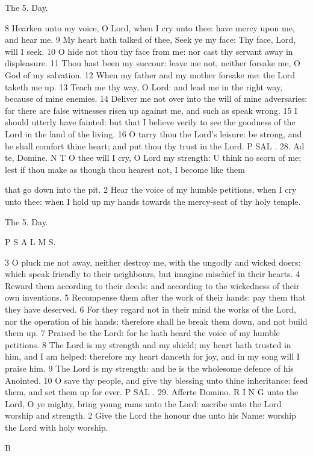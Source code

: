 The 5. Day.

8 Hearken unto my voice, O Lord, when I cry unto thee: have mercy upon me, and hear me. 9 My heart hath talked of thee, Seek ye my face: Thy face, Lord, will I seek. 10 O hide not thou thy face from me: nor cast thy servant away in displeasure. 11 Thou hast been my succour: leave me not, neither forsake me, O God of my salvation. 12 When my father and my mother forsake me: the Lord taketh me up. 13 Teach me thy way, O Lord: and lead me in the right way, because of mine enemies. 14 Deliver me not over into the will of mine adversaries: for there are false witnesses risen up against me, and such as speak wrong. 15 I should utterly have fainted: but that I believe verily to see the goodness of the Lord in the land of the living. 16 O tarry thou the Lord’s leisure: be strong, and he shall comfort thine heart; and put thou thy trust in the Lord. P SAL . 28. Ad te, Domine. N T O thee will I cry, O Lord my strength: U think no scorn of me; lest if thou make as though thou hearest not, I become like them

that go down into the pit. 2 Hear the voice of my humble petitions, when I cry unto thee: when I hold up my hands towards the mercy-seat of thy holy temple.

The 5. Day.

P S A L M S.

3 O pluck me not away, neither destroy me, with the ungodly and wicked doers: which speak friendly to their neighbours, but imagine mischief in their hearts. 4 Reward them according to their deeds: and according to the wickedness of their own inventions. 5 Recompense them after the work of their hands: pay them that they have deserved. 6 For they regard not in their mind the works of the Lord, nor the operation of his hands: therefore shall he break them down, and not build them up. 7 Praised be the Lord: for he hath heard the voice of my humble petitions. 8 The Lord is my strength and my shield; my heart hath trusted in him, and I am helped: therefore my heart danceth for joy, and in my song will I praise him. 9 The Lord is my strength: and he is the wholesome defence of his Anointed. 10 O save thy people, and give thy blessing unto thine inheritance: feed them, and set them up for ever. P SAL . 29. Afferte Domino. R I N G unto the Lord, O ye mighty, bring young rams unto the Lord: ascribe unto the Lord worship and strength. 2 Give the Lord the honour due unto his Name: worship the Lord with holy worship.

B

